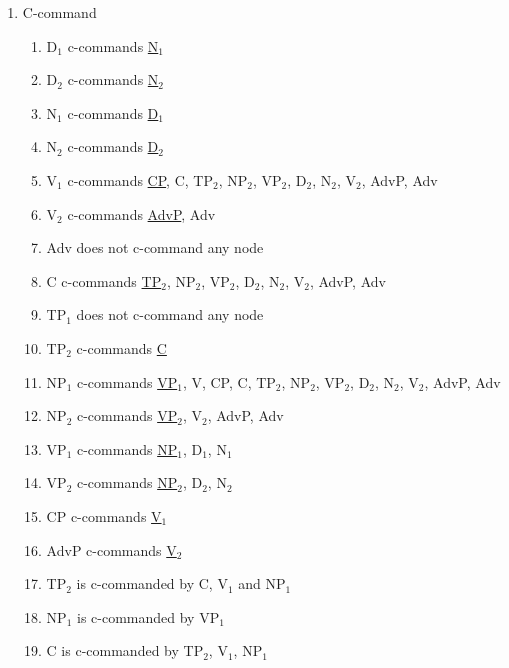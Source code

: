 \documentclass[12pt]{article}
\begin{document}
\begin{enumerate}
\item C-command
\begin{enumerate}[label=\arabic*)]
\item D$_{1}$ c-commands \underline{N$_{1}$}
\item D$_{2}$ c-commands \underline{N$_{2}$}
\item N$_{1}$ c-commands \underline{D$_{1}$}
\item N$_{2}$ c-commands \underline{D$_{2}$}
\item V$_{1}$ c-commands \underline{CP}, C, TP$_{2}$, NP$_{2}$, VP$_{2}$, D$_{2}$, N$_{2}$, V$_{2}$, AdvP, Adv
\item V$_{2}$ c-commands \underline{AdvP}, Adv
\item Adv does not c-command any node
\item C c-commands \underline{TP$_{2}$}, NP$_{2}$, VP$_{2}$, D$_{2}$, N$_{2}$, V$_{2}$, AdvP, Adv
\item TP$_{1}$ does not c-command any node
\item TP$_{2}$ c-commands \underline{C}
\item NP$_{1}$ c-commands \underline{VP$_{1}$}, V, CP, C, TP$_{2}$, NP$_{2}$, VP$_{2}$, D$_{2}$, N$_{2}$, V$_{2}$, AdvP, Adv
\item NP$_{2}$ c-commands \underline{VP$_{2}$}, V$_{2}$, AdvP, Adv
\item VP$_{1}$ c-commands \underline{NP$_{1}$}, D$_{1}$, N$_{1}$
\item VP$_{2}$ c-commands \underline{NP$_{2}$}, D$_{2}$, N$_{2}$
\item CP c-commands \underline{V$_{1}$}
\item AdvP c-commands \underline{V$_{2}$}
\item TP$_{2}$ is c-commanded by C, V$_{1}$ and NP$_{1}$
\item NP$_{1}$ is c-commanded by VP$_{1}$
\item C is c-commanded by TP$_{2}$, V$_{1}$, NP$_{1}$
\end{enumerate}


\end{enumerate}
\end{document}
